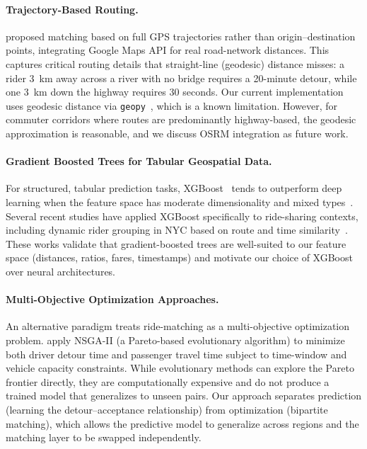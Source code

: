 \documentclass{article}
\begin{document}
\paragraph{Trajectory-Based Routing.}
\citet{hsieh2017car} proposed matching based on full GPS trajectories rather than origin--destination points, integrating Google Maps API for real road-network distances. This captures critical routing details that straight-line (geodesic) distance misses: a rider 3~km away across a river with no bridge requires a 20-minute detour, while one 3~km down the highway requires 30 seconds. Our current implementation uses geodesic distance via \texttt{geopy}~\citep{geopy}, which is a known limitation. However, for commuter corridors where routes are predominantly highway-based, the geodesic approximation is reasonable, and we discuss OSRM integration as future work.

\paragraph{Gradient Boosted Trees for Tabular Geospatial Data.}
For structured, tabular prediction tasks, XGBoost~\citep{chen2016xgboost} tends to outperform deep learning when the feature space has moderate dimensionality and mixed types~\citep{grinsztajn2022tree}. Several recent studies have applied XGBoost specifically to ride-sharing contexts, including dynamic rider grouping in NYC based on route and time similarity~\citep{ma2023xgboost}. These works validate that gradient-boosted trees are well-suited to our feature space (distances, ratios, fares, timestamps) and motivate our choice of XGBoost over neural architectures.

\paragraph{Multi-Objective Optimization Approaches.}
An alternative paradigm treats ride-matching as a multi-objective optimization problem. \citet{wang2023multiobjective} apply NSGA-II (a Pareto-based evolutionary algorithm) to minimize both driver detour time and passenger travel time subject to time-window and vehicle capacity constraints. While evolutionary methods can explore the Pareto frontier directly, they are computationally expensive and do not produce a trained model that generalizes to unseen pairs. Our approach separates prediction (learning the detour--acceptance relationship) from optimization (bipartite matching), which allows the predictive model to generalize across regions and the matching layer to be swapped independently.
\end{document}

